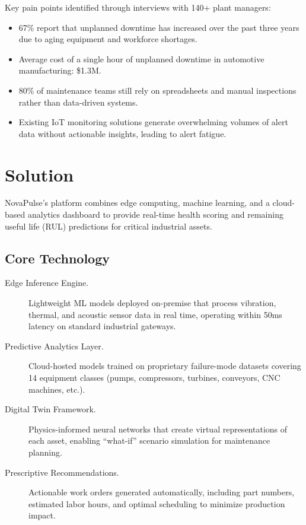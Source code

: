 \documentclass[
    language=english,
    doctype=business-plan,
    institution=none,
]{../../omnilatex}
\begin{document}
Key pain points identified through interviews with 140+ plant managers:

\begin{itemize}
    \item 67\% report that unplanned downtime has increased over the past
          three years due to aging equipment and workforce shortages.
    \item Average cost of a single hour of unplanned downtime in automotive
          manufacturing: \$1.3M.
    \item 80\% of maintenance teams still rely on spreadsheets and manual
          inspections rather than data-driven systems.
    \item Existing IoT monitoring solutions generate overwhelming volumes of
          alert data without actionable insights, leading to alert fatigue.
\end{itemize}

\section{Solution}

NovaPulse's platform combines edge computing, machine learning, and a
cloud-based analytics dashboard to provide real-time health scoring and
remaining useful life (RUL) predictions for critical industrial assets.

\subsection{Core Technology}

\begin{description}
    \item[Edge Inference Engine.] Lightweight ML models deployed on-premise
        that process vibration, thermal, and acoustic sensor data in real time,
        operating within 50ms latency on standard industrial gateways.
    \item[Predictive Analytics Layer.] Cloud-hosted models trained on
        proprietary failure-mode datasets covering 14 equipment classes
        (pumps, compressors, turbines, conveyors, CNC machines, etc.).
    \item[Digital Twin Framework.] Physics-informed neural networks that
        create virtual representations of each asset, enabling ``what-if''
        scenario simulation for maintenance planning.
    \item[Prescriptive Recommendations.] Actionable work orders generated
        automatically, including part numbers, estimated labor hours, and
        optimal scheduling to minimize production impact.
\end{description}
\end{document}
